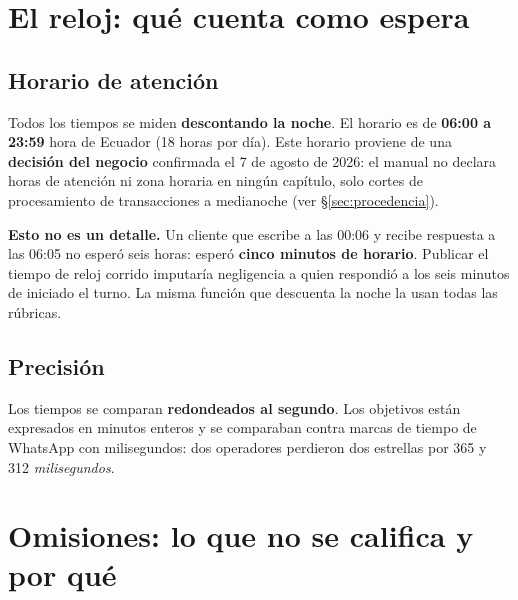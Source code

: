 \documentclass[11pt,a4paper]{article}
\begin{document}
\newpage
\section{El reloj: qué cuenta como espera}

\subsection{Horario de atención}

Todos los tiempos se miden \textbf{descontando la noche}. El horario es de
\textbf{06:00 a 23:59} hora de Ecuador (18 horas por día). Este horario proviene de una
\textbf{decisión del negocio} confirmada el 7 de agosto de 2026: el manual no declara horas
de atención ni zona horaria en ningún capítulo, solo cortes de procesamiento de
transacciones a medianoche (ver \S\ref{sec:procedencia}).

\begin{alerta}
\textbf{Esto no es un detalle.} Un cliente que escribe a las 00:06 y recibe respuesta
a las 06:05 no esperó seis horas: esperó \textbf{cinco minutos de horario}. Publicar
el tiempo de reloj corrido imputaría negligencia a quien respondió a los seis minutos
de iniciado el turno. La misma función que descuenta la noche la usan todas las rúbricas.
\end{alerta}

\subsection{Precisión}

Los tiempos se comparan \textbf{redondeados al segundo}. Los objetivos están
expresados en minutos enteros y se comparaban contra marcas de tiempo de WhatsApp con
milisegundos: dos operadores perdieron dos estrellas por 365 y 312 \emph{milisegundos}.

\newpage
\section{Omisiones: lo que no se califica y por qué}
\end{document}
